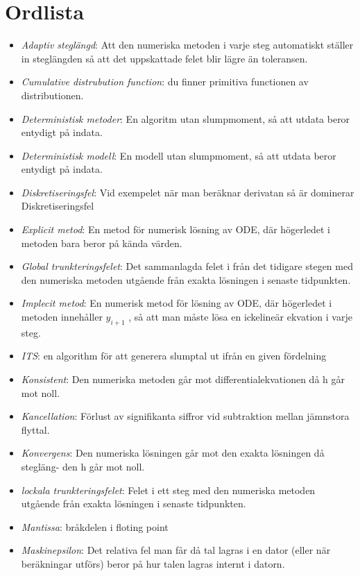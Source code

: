 \section{Ordlista}
\begin{itemize}
  \item \textit{Adaptiv steglängd}: Att den numeriska metoden i varje steg automatiskt ställer in
steglängden så att det uppskattade felet blir lägre än toleransen.
  \item \textit{Cumulative distrubution function}: du finner primitiva functionen av distributionen.
  \item \textit{Deterministisk metoder}: En algoritm utan slumpmoment, så att utdata beror entydigt på
indata.
  \item \textit{Deterministisk modell}: En modell utan slumpmoment, så att utdata beror entydigt på
indata.
  \item \textit{Diskretiseringsfel}: Vid exempelet när man beräknar derivatan så är
dominerar Diskretiseringsfel
  \item \textit{Explicit metod}: En metod för numerisk lösning av ODE, där högerledet i metoden
bara beror på kända värden.
  \item \textit{Global trunkteringsfelet}: Det sammanlagda felet i från det tidigare stegen med den numeriska metoden utgående från exakta
lösningen i senaste tidpunkten.
  \item \textit{Implecit metod}: En numerisk metod för lösning av ODE, där högerledet i metoden
innehåller $y_{i+1}$ , så att man måste lösa en ickelineär ekvation i varje
steg.
  \item \textit{ITS}: en algorithm för att generera slumptal ut ifrån en given fördelning
  \item \textit{Konsistent}: Den numeriska metoden går mot diﬀerentialekvationen då h går
mot noll.
 \item \textit{Kancellation}: Förlust av signifikanta siﬀror vid subtraktion mellan jämnstora
flyttal.
  \item \textit{Konvergens}: Den numeriska lösningen går mot den exakta lösningen då stegläng-
den h går mot noll.
  \item \textit{lockala trunkteringsfelet}: Felet i ett steg med den numeriska metoden utgående från exakta
lösningen i senaste tidpunkten.
  \item \textit{Mantissa}: bråkdelen i floting point
  \item \textit{Maskinepsilon}: Det relativa fel man får då tal lagras i en dator (eller när beräkningar utförs) beror på hur talen lagras internt i datorn.

\end{itemize}
